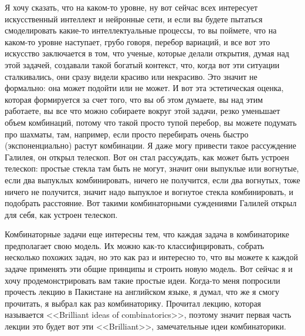 \documentclass[russian]{lecture-notes}
\theoremstyle{definition}
\begin{document}
	Я хочу сказать, что на каком-то уровне, ну вот сейчас всех интересует искусственный интеллект и нейронные сети, и если вы будете пытаться смоделировать какие-то интеллектуальные процессы, то вы поймете, что на каком-то уровне наступает, грубо говоря, перебор вариаций, и все вот это искусство заключается в том, что ученые, которые делали открытия, думая над этой задачей, создавали такой богатый контекст, что, когда вот эти ситуации сталкивались, они сразу видели красиво или некрасиво. Это значит не формально: она может подойти или не может. И вот эта эстетическая оценка, которая формируется за счет того, что вы об этом думаете, вы над этим работаете, вы все что можно собираете вокруг этой задачи, резко уменьшает объем комбинаций, потому что такой просто тупой перебор, вы можете подумать про шахматы, там, например, если просто перебирать очень быстро (экспоненциально) растут комбинации. Я даже могу привести такое рассуждение Галилея, он открыл телескоп. Вот он стал рассуждать, как может быть устроен телескоп: простые стекла там быть не могут, значит они выпуклые или вогнутые, если два выпуклых комбинировать, ничего не получится, если два вогнутых, тоже ничего не получится, значит надо выпуклое и вогнутое стекла комбинировать, и подобрать расстояние. Вот такими комбинаторными суждениями Галилей открыл для себя, как устроен телескоп.
	
	Комбинаторные задачи еще интересны тем, что каждая задача в комбинаторике предполагает свою модель. Их можно как-то классифицировать, собрать несколько похожих задач, но это как раз и интересно то, что вы можете к каждой задаче применять эти общие принципы и строить новую модель. Вот сейчас я и хочу продемонстрировать вам такие простые идеи. Когда-то меня попросили прочесть лекцию в Пакистане на английском языке, я думал, что же я смогу прочитать, я выбрал как раз комбинаторику. Прочитал лекцию, которая называется <<Brilliant ideas of combinatorics>>, поэтому значит первая часть лекции это будет вот эти <<Brilliant>>, замечательные идеи комбинаторики.
	
	
\end{document}
